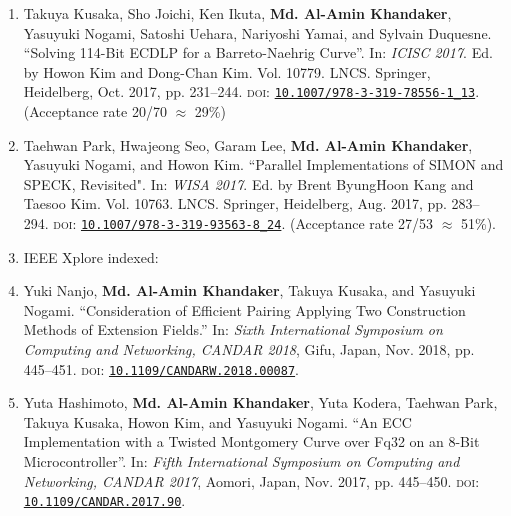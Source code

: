 \documentclass{article}[paper=a4,10pt]
\begin{document}
\begin{enumerate}
	\item Takuya Kusaka, Sho Joichi, Ken Ikuta, \textbf{Md. Al-Amin Khandaker},  Yasuyuki Nogami, Satoshi Uehara, Nariyoshi Yamai, and Sylvain Duquesne. ``Solving 114-Bit ECDLP for a Barreto-Naehrig Curve''. In: \textit{ICISC 2017}. Ed. by Howon Kim and Dong-Chan Kim. Vol. 10779. LNCS. Springer, Heidelberg, Oct. 2017, pp. 231–244. \textsc{doi}: \href{https://doi.org/10.1007/978-3-319-78556-1_13}{\texttt{10.1007/978-3-319-78556-1\_13}}.
	(Acceptance rate 20/70 $\approx$ 29\%)
	
	\item  Taehwan Park, Hwajeong Seo, Garam Lee,\textbf{ Md. Al-Amin Khandaker}, Yasuyuki Nogami, and Howon Kim. ``Parallel Implementations of SIMON and SPECK, Revisited". In: \textit{WISA 2017}. Ed. by Brent ByungHoon Kang and Taesoo Kim. Vol. 10763. LNCS. Springer, Heidelberg, Aug. 2017, pp. 283–294. \textsc{doi}: \href{https://doi.org/10.1007/978-3-319-93563-8_24}{\texttt{10.1007/978-3-319-93563-8\_24}}.  
	(Acceptance rate 27/53 $\approx$ 51\%).
	
	\vspace{5mm}
	\item[ ] \Large IEEE Xplore indexed:
	\normalsize
	
	
	\item Yuki Nanjo, \textbf{Md. Al-Amin Khandaker}, Takuya Kusaka, and Yasuyuki Nogami. ``Consideration of Efficient Pairing Applying Two Construction Methods of Extension Fields.'' In:  \textit{Sixth International Symposium on Computing and Networking, CANDAR 2018}, Gifu, Japan, Nov. 2018, pp. 445–451. \textsc{doi}: \href{https://doi.org/10.1109/CANDARW.2018.00087}{\texttt{10.1109/CANDARW.2018.00087}}.
	
	\item Yuta Hashimoto, \textbf{Md. Al-Amin Khandaker}, Yuta Kodera, Taehwan Park, Takuya Kusaka, Howon Kim, and Yasuyuki Nogami. ``An ECC Implementation with a Twisted Montgomery Curve over Fq32 on an 8-Bit Microcontroller''. In: \textit{Fifth International Symposium on Computing and Networking, CANDAR 2017}, Aomori, Japan, Nov. 2017, pp. 445–450. \textsc{doi}: \href{https://doi.org/10.1109/CANDAR.2017.90}{\texttt{10.1109/CANDAR.2017.90}}.
	

\end{enumerate}
\end{document}
